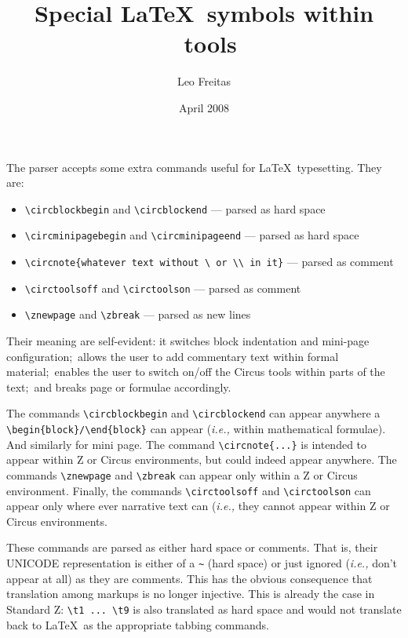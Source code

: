 \documentclass{article}
\begin{document}
\title{Special \LaTeX\ symbols within \Circus\ tools}
\author{Leo Freitas}
\date{April 2008}

\maketitle

The parser accepts some extra commands useful for \LaTeX\ typesetting.
They are:
\begin{itemize}
   \item \verb'\circblockbegin' and \verb'\circblockend' --- parsed as hard space
   \item \verb'\circminipagebegin' and \verb'\circminipageend' --- parsed as hard space
   \item \verb'\circnote{whatever text without \ or \\ in it}' --- parsed as comment
   \item \verb'\circtoolsoff' and \verb'\circtoolson' --- parsed as comment
   \item \verb'\znewpage' and \verb'\zbreak' --- parsed as new lines
\end{itemize}
%
Their meaning are self-evident: it switches block indentation and
mini-page configuration;~allows the user to add commentary text
within formal material;~enables the user to switch on/off the
Circus tools within parts of the text;~and breaks page or formulae
accordingly.

The commands \verb'\circblockbegin' and \verb'\circblockend' can appear anywhere
a \verb'\begin{block}/\end{block}'
can appear (\textit{i.e.,} within mathematical formulae). And similarly for mini page.
The command \verb'\circnote{...}' is intended to appear within Z or Circus environments,
but could indeed appear anywhere. The commands \verb'\znewpage' and \verb'\zbreak' can
appear only within a Z or Circus environment. Finally, the commands
\verb'\circtoolsoff' and \verb'\circtoolson' can appear only where ever narrative text
can (\textit{i.e.,} they cannot appear within Z or Circus environments.

These commands are parsed as either hard space or comments.
That is, their UNICODE representation is either of a \verb'~' (hard space)
or just ignored (\textit{i.e.,} don't appear at all) as they are comments.
This has the obvious consequence that translation among markups is no longer
injective. This is already the case in Standard Z: \verb'\t1 ... \t9' is
also translated as hard space and would not translate back to \LaTeX\ as
the appropriate tabbing commands.
\end{document}
